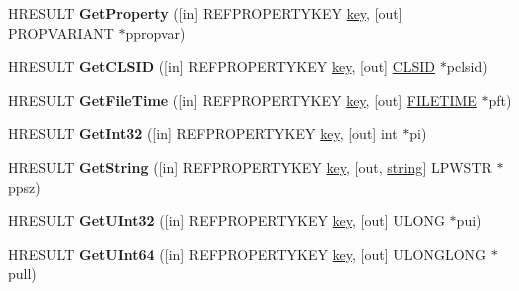 \begin{DoxyCompactItemize}
\item 
\mbox{\label{interfaceenum_a31c3418689e5cb9b8ba054f8f292fee1}} 
H\+R\+E\+S\+U\+LT {\bfseries Get\+Property} (\mbox{[}in\mbox{]} R\+E\+F\+P\+R\+O\+P\+E\+R\+T\+Y\+K\+EY \hyperlink{structkey}{key}, \mbox{[}out\mbox{]} P\+R\+O\+P\+V\+A\+R\+I\+A\+NT $\ast$ppropvar)
\item 
\mbox{\label{interfaceenum_a71bdcf2422b9954b2e59c0b3f8723181}} 
H\+R\+E\+S\+U\+LT {\bfseries Get\+C\+L\+S\+ID} (\mbox{[}in\mbox{]} R\+E\+F\+P\+R\+O\+P\+E\+R\+T\+Y\+K\+EY \hyperlink{structkey}{key}, \mbox{[}out\mbox{]} \hyperlink{struct___i_i_d}{C\+L\+S\+ID} $\ast$pclsid)
\item 
\mbox{\label{interfaceenum_a65612350c257b2fa76b6402f21b4cec4}} 
H\+R\+E\+S\+U\+LT {\bfseries Get\+File\+Time} (\mbox{[}in\mbox{]} R\+E\+F\+P\+R\+O\+P\+E\+R\+T\+Y\+K\+EY \hyperlink{structkey}{key}, \mbox{[}out\mbox{]} \hyperlink{struct___f_i_l_e_t_i_m_e}{F\+I\+L\+E\+T\+I\+ME} $\ast$pft)
\item 
\mbox{\label{interfaceenum_a4fdf745c83700068f4b623df554ef8ef}} 
H\+R\+E\+S\+U\+LT {\bfseries Get\+Int32} (\mbox{[}in\mbox{]} R\+E\+F\+P\+R\+O\+P\+E\+R\+T\+Y\+K\+EY \hyperlink{structkey}{key}, \mbox{[}out\mbox{]} int $\ast$pi)
\item 
\mbox{\label{interfaceenum_ae50091b217ecf2f176b4cf1cf984da1c}} 
H\+R\+E\+S\+U\+LT {\bfseries Get\+String} (\mbox{[}in\mbox{]} R\+E\+F\+P\+R\+O\+P\+E\+R\+T\+Y\+K\+EY \hyperlink{structkey}{key}, \mbox{[}out, \hyperlink{structstring}{string}\mbox{]} L\+P\+W\+S\+TR $\ast$ppsz)
\item 
\mbox{\label{interfaceenum_aee261448ecc8ac95cf3ff7285ce892e3}} 
H\+R\+E\+S\+U\+LT {\bfseries Get\+U\+Int32} (\mbox{[}in\mbox{]} R\+E\+F\+P\+R\+O\+P\+E\+R\+T\+Y\+K\+EY \hyperlink{structkey}{key}, \mbox{[}out\mbox{]} U\+L\+O\+NG $\ast$pui)
\item 
\mbox{\label{interfaceenum_a68d9d0b9c11bd03f5c30fd872ca85fe4}} 
H\+R\+E\+S\+U\+LT {\bfseries Get\+U\+Int64} (\mbox{[}in\mbox{]} R\+E\+F\+P\+R\+O\+P\+E\+R\+T\+Y\+K\+EY \hyperlink{structkey}{key}, \mbox{[}out\mbox{]} U\+L\+O\+N\+G\+L\+O\+NG $\ast$pull)
\item 

\end{DoxyCompactItemize}
